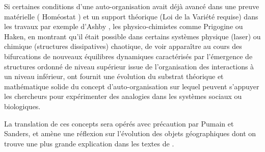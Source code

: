 Si certaines conditions d'une auto-organisation avait déjà avancé dans une preuve matérielle ( Homéostat ) et un support théorique (Loi de la Variété requise) dans les travaux par exemple d'Ashby \autocite[800-801]{Pouvreau2013}, les physico-chimistes comme Prigogine ou Haken, en montrant qu'il était possible dans certains systèmes physique (laser) ou chimique (structures dissipatives) chaotique, de voir apparaître au cours des bifurcations de nouveaux équilibres dynamiques caractérisés par l'émergence de structures ordonné de niveau supérieur issue de l'organisation des interactions à un niveau inférieur, ont fournit une évolution du substrat théorique et mathématique solide du concept d'auto-organisation sur lequel peuvent s'appuyer les chercheurs pour expérimenter des analogies dans les systèmes sociaux ou biologiques.




La translation de ces concepts sera opérés avec précaution par Pumain et Sanders, et amène une réflexion sur l'évolution des objets géographiques dont on trouve une plus grande explication dans les textes de \textcite{Pumain1982b, Pumain1989}.





